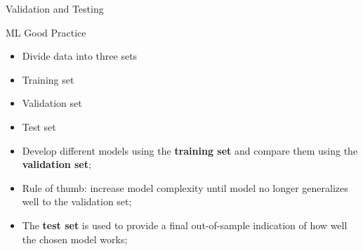 \documentclass[11pt]{beamer}
\begin{document}
\begin{frame}{Validation and Testing}

ML Good Practice

	\begin{itemize}
		\item Divide data into three sets
		\item Training set
		\item Validation set
		\item Test set
		\item Develop different models using the \textbf{training set} and compare them using the \textbf{validation set};
		\item Rule of thumb: increase model complexity until model no longer generalizes well to the validation set;
		\item The \textbf{test set} is used to provide a final out-of-sample indication of how well the chosen model works;
	\end{itemize}
\end{frame}
%
\end{document}
